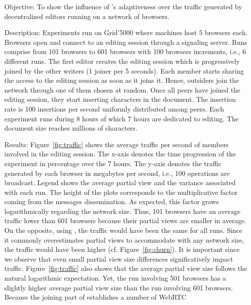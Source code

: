 \begin{asparadesc}
\item [Objective:] To show the influence of \SPRAY's adaptiveness over the
  traffic generated by decentralized editors running on a network of browsers.
\item [Description:] Experiments run on Grid'5000 where machines host 5 browsers
  each. Browsers open \CRATE and connect to an editing session through a
  signaling server.  Runs comprise from 101 browsers to 601 browsers with 100
  browsers increments, i.e., 6 different runs.  The first editor creates the
  editing session which is progressively joined by the other writers (1 joiner
  per 5 seconds). Each member starts sharing the access to the editing session
  as soon as it joins it. Hence, outsiders join the network through one of them
  chosen at random. Once all peers have joined the editing session, they start
  inserting characters in the document. The insertion rate is 100 insertions per
  second uniformly distributed among peers. Each experiment runs during 8 hours
  of which 7 hours are dedicated to editing. The document size reaches millions
  of characters.
\item [Results:] Figure~\ref{fig:traffic} shows the average traffic per second
  of members involved in the editing session. The x-axis denotes the time
  progression of the experiment in percentage over the 7 hours. The y-axis
  denotes the traffic generated by each browser in megabytes per second, i.e.,
  100 operations are broadcast. Legend shows the average partial view and the
  variance associated with each run. The height of the plots corresponds to the
  multiplicative factor coming from the messages dissemination. As expected,
  this factor grows logarithmically regarding the network size. Thus, 101
  browsers have an average traffic lower than 601 browsers because their partial
  views are smaller in average.  On the opposite, using \CYCLON, the traffic
  would have been the same for all runs. Since it commonly overestimates partial
  views to accommodate with any network size, the traffic would have been higher
  (cf. Figure~\ref{fig:churn}). It is important since we observe that even small
  partial view size differences significatively impact traffic.
  Figure~\ref{fig:traffic} also shows that the average partial view size follows
  the natural logarithmic expectation. Yet, the run involving 501 browsers has a
  slightly higher average partial view size than the run involving 601
  browsers. Because the joining part of \SPRAY establishes a number of WebRTC

\end{asparadesc}
